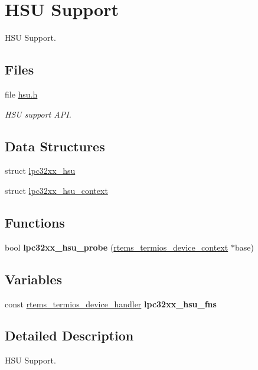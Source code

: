 \hypertarget{group__lpc32xx__hsu}{}\section{H\+SU Support}
\label{group__lpc32xx__hsu}


H\+SU Support.  


\subsection*{Files}
\begin{DoxyCompactItemize}
\item 
file \mbox{\hyperlink{hsu_8h}{hsu.\+h}}
\begin{DoxyCompactList}\small\item\em H\+SU support A\+PI. \end{DoxyCompactList}\end{DoxyCompactItemize}
\subsection*{Data Structures}
\begin{DoxyCompactItemize}
\item 
struct \mbox{\hyperlink{structlpc32xx__hsu}{lpc32xx\+\_\+hsu}}
\item 
struct \mbox{\hyperlink{structlpc32xx__hsu__context}{lpc32xx\+\_\+hsu\+\_\+context}}
\end{DoxyCompactItemize}
\subsection*{Functions}
\begin{DoxyCompactItemize}
\item 
\mbox{\label{group__lpc32xx__hsu_ga893298450b4e7d1740bffc80f79ac5ba}} 
bool {\bfseries lpc32xx\+\_\+hsu\+\_\+probe} (\mbox{\hyperlink{structrtems__termios__device__context}{rtems\+\_\+termios\+\_\+device\+\_\+context}} $\ast$base)
\end{DoxyCompactItemize}
\subsection*{Variables}
\begin{DoxyCompactItemize}
\item 
\mbox{\label{group__lpc32xx__hsu_gafa9b2dc705c1eb98fbe28518ecf7336b}} 
const \mbox{\hyperlink{structrtems__termios__device__handler}{rtems\+\_\+termios\+\_\+device\+\_\+handler}} {\bfseries lpc32xx\+\_\+hsu\+\_\+fns}
\end{DoxyCompactItemize}


\subsection{Detailed Description}
H\+SU Support. 

